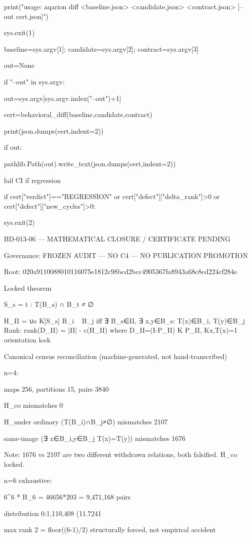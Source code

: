 print("usage: aqarion diff <baseline.json> <candidate.json> <contract.json> [--out cert.json]")

sys.exit(1)

baseline=sys.argv[1]; candidate=sys.argv[2]; contract=sys.argv[3]

out=None

if "--out" in sys.argv:

out=sys.argv[sys.argv.index("--out")+1]

cert=behavioral_diff(baseline,candidate,contract)

print(json.dumps(cert,indent=2))

if out:

pathlib.Path(out).write_text(json.dumps(cert,indent=2))


fail CI if regression


if cert["verdict"]=="REGRESSION" or cert["defect"]["delta_rank"]>0 or cert["defect"]["new_cycles"]>0:

sys.exit(2)

BD-013-06 — MATHEMATICAL CLOSURE / CERTIFICATE PENDING

Governance: FROZEN AUDIT — NO C4 — NO PUBLICATION PROMOTION

Root: 020a9110088010116075e1812c98bcd2bcc4905367fa8943a68c8cd224cf284e


Locked theorem

S_s = { t : T(B_s) ∩ B_t ≠ ∅ }

H_Π = ∪s K[S_s] B_i ~ B_j iff ∃ B_s∈Π, ∃ x,y∈B_s: T(x)∈B_i, T(y)∈B_j Rank: rank(D_Π) = |Π| - c(H_Π) where D_Π=(I-P_Π) K P_Π, K{x,T(x)}=1 orientation lock


Canonical census reconciliation (machine-generated, not hand-transcribed)

n=4:


maps 256, partitions 15, pairs 3840

H_co mismatches 0

H_under ordinary (T(B_i)∩B_j≠∅) mismatches 2107

same-image (∃ x∈B_i,y∈B_j T(x)=T(y)) mismatches 1676

Note: 1676 vs 2107 are two different withdrawn relations, both falsified. H_co locked.

n=6 exhaustive:


6^6 * B_6 = 46656*203 = 9,471,168 pairs

distribution 0:1,110,408 (11.7241%

max rank 2 = floor((6-1)/2) structurally forced, not empirical accident

